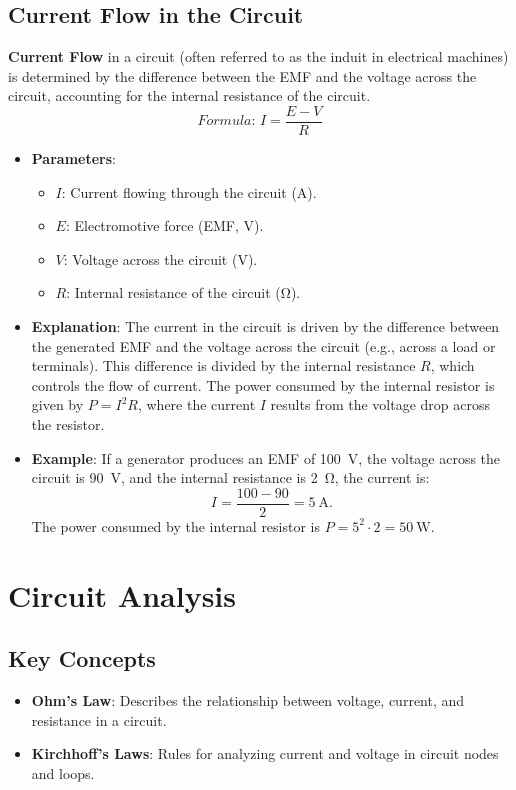 \documentclass[12pt]{article}
\newcommand{\concept}[1]{\textbf{#1}}
\newcommand{\formula}[1]{\textit{Formula: }#1}
\begin{document}
\subsection{Current Flow in the Circuit}
\concept{Current Flow} in a circuit (often referred to as the induit in electrical machines) is determined by the difference between the EMF and the voltage across the circuit, accounting for the internal resistance of the circuit.
\[
\formula{I = \frac{E - V}{R}}
\]
\begin{itemize}
    \item \textbf{Parameters}:
        \begin{itemize}
            \item \(I\): Current flowing through the circuit (\si{\ampere}).
            \item \(E\): Electromotive force (EMF, \si{\volt}).
            \item \(V\): Voltage across the circuit (\si{\volt}).
            \item \(R\): Internal resistance of the circuit (\si{\ohm}).
        \end{itemize}
    \item \textbf{Explanation}: The current in the circuit is driven by the difference between the generated EMF and the voltage across the circuit (e.g., across a load or terminals). This difference is divided by the internal resistance \(R\), which controls the flow of current. The power consumed by the internal resistor is given by \(P = I^2 R\), where the current \(I\) results from the voltage drop across the resistor.
    \item \textbf{Example}: If a generator produces an EMF of \SI{100}{\volt}, the voltage across the circuit is \SI{90}{\volt}, and the internal resistance is \SI{2}{\ohm}, the current is:
        \[
        I = \frac{100 - 90}{2} = \SI{5}{\ampere}.
        \]
        The power consumed by the internal resistor is \(P = 5^2 \cdot 2 = \SI{50}{\watt}\).
\end{itemize}

\section{Circuit Analysis}
\subsection{Key Concepts}
\begin{itemize}
    \item \concept{Ohm's Law}: Describes the relationship between voltage, current, and resistance in a circuit.
    \item \concept{Kirchhoff's Laws}: Rules for analyzing current and voltage in circuit nodes and loops.
\end{itemize}
\end{document}
